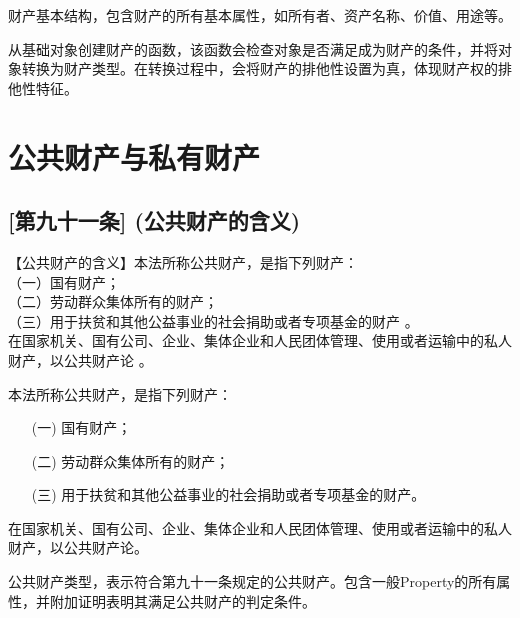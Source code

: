 \begin{definition}\label{Property}
\leanok
{}
财产基本结构，包含财产的所有基本属性，如所有者、资产名称、价值、用途等。
\end{definition}

\begin{definition}\label{createPropertyFromObject}
\leanok
{}
从基础对象创建财产的函数，该函数会检查对象是否满足成为财产的条件，并将对象转换为财产类型。在转换过程中，会将财产的排他性设置为真，体现财产权的排他性特征。
\end{definition}

\section{公共财产与私有财产}

\subsection{[第九十一条] (公共财产的含义)}

【公共财产的含义】本法所称公共财产，是指下列财产：\\
（一）国有财产；\\
（二）劳动群众集体所有的财产；\\
（三）用于扶贫和其他公益事业的社会捐助或者专项基金的财产 。\\
在国家机关、国有公司、企业、集体企业和人民团体管理、使用或者运输中的私人财产，以公共财产论 。

\begin{definition}\label{isPublicProperty}
\leanok
{}
本法所称公共财产，是指下列财产：
\begin{enumerate}
\item[(一)] 国有财产；
\item[(二)] 劳动群众集体所有的财产；
\item[(三)] 用于扶贫和其他公益事业的社会捐助或者专项基金的财产。
\end{enumerate}
在国家机关、国有公司、企业、集体企业和人民团体管理、使用或者运输中的私人财产，以公共财产论。
\end{definition}

\begin{definition}\label{PublicProperty}
\leanok
{}
公共财产类型，表示符合第九十一条规定的公共财产。包含一般Property的所有属性，并附加证明表明其满足公共财产的判定条件。
\end{definition}


